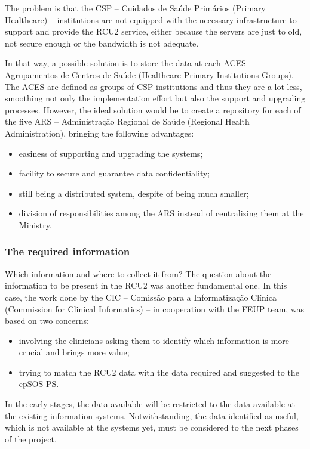 The problem is that the CSP -- Cuidados de Saúde Primários (Primary Healthcare) -- institutions are not equipped with the necessary infrastructure to support and provide the RCU2 service, either because the servers are just to old, not secure enough or the bandwidth is not adequate.

In that way, a possible solution is to store the data at each ACES -- Agrupamentos de Centros de Saúde (Healthcare Primary Institutions Groups). The ACES are defined as groups of CSP institutions and thus they are a lot less, smoothing not only the implementation effort but also the support and upgrading processes. However, the ideal solution would be to create a repository for each of the five ARS -- Administração Regional de Saúde (Regional Health Administration), bringing the following advantages:
\begin{itemize}
\item easiness of supporting and upgrading the systems;
\item facility to secure and guarantee data confidentiality;
\item still being a distributed system, despite of being much smaller;
\item division of responsibilities among the ARS instead of centralizing them at the Ministry.
\end{itemize}



\subsubsection{The required information}

Which information and where to collect it from? The question about the information to be present in the RCU2 was another fundamental one. In this case, the work done by the CIC -- Comissão para a Informatização Clínica (Commission for Clinical Informatics) -- in cooperation with the FEUP team, was based on two concerns:
\begin{itemize}
\item involving the clinicians asking them to identify which information is more crucial and brings more value;
\item trying to match the RCU2 data with the data required and suggested to the epSOS PS.
\end{itemize}
In the early stages, the data available will be restricted to the data available at the existing information systems. Notwithstanding, the data identified as useful, which is not available at the systems yet, must be considered to the next phases of the project.

